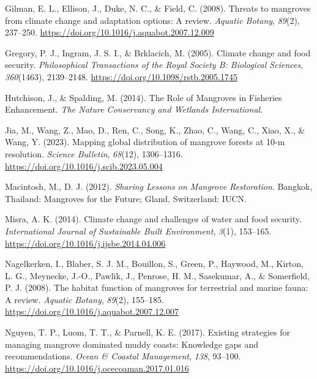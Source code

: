 \documentclass[
  12pt,
]{article}
\newlength{\cslhangindent}
\newenvironment{CSLReferences}[2] %
 {\begin{list}{}{%
  \setlength{\itemindent}{0pt}
  \setlength{\leftmargin}{0pt}
  \setlength{\parsep}{0pt}
  \ifodd #1
   \setlength{\leftmargin}{\cslhangindent}
   \setlength{\itemindent}{-1\cslhangindent}
  \fi
  \setlength{\itemsep}{#2\baselineskip}}}
 {\end{list}}
\begin{document}
\begin{CSLReferences}{1}{2}
Gilman, E. L., Ellison, J., Duke, N. C., \& Field, C. (2008). Threats to mangroves from climate change and adaptation options: {A} review. \emph{Aquatic Botany}, \emph{89}(2), 237--250. \url{https://doi.org/10.1016/j.aquabot.2007.12.009}

Gregory, P. J., Ingram, J. S. I., \& Brklacich, M. (2005). Climate change and food security. \emph{Philosophical Transactions of the Royal Society B: Biological Sciences}, \emph{360}(1463), 2139--2148. \url{https://doi.org/10.1098/rstb.2005.1745}

Hutchison, J., \& Spalding, M. (2014). The {Role} of {Mangroves} in {Fisheries Enhancement}. \emph{The Nature Conservancy and Wetlands International.}

Jia, M., Wang, Z., Mao, D., Ren, C., Song, K., Zhao, C., Wang, C., Xiao, X., \& Wang, Y. (2023). Mapping global distribution of mangrove forests at 10-m resolution. \emph{Science Bulletin}, \emph{68}(12), 1306--1316. \url{https://doi.org/10.1016/j.scib.2023.05.004}

Macintosh, M., D. J. (2012). \emph{{Sharing Lessons} on {Mangrove Restoration}}. Bangkok, Thailand: Mangroves for the Future; Gland, Switzerland: IUCN.

Misra, A. K. (2014). Climate change and challenges of water and food security. \emph{International Journal of Sustainable Built Environment}, \emph{3}(1), 153--165. \url{https://doi.org/10.1016/j.ijsbe.2014.04.006}

Nagelkerken, I., Blaber, S. J. M., Bouillon, S., Green, P., Haywood, M., Kirton, L. G., Meynecke, J.-O., Pawlik, J., Penrose, H. M., Sasekumar, A., \& Somerfield, P. J. (2008). The habitat function of mangroves for terrestrial and marine fauna: {A} review. \emph{Aquatic Botany}, \emph{89}(2), 155--185. \url{https://doi.org/10.1016/j.aquabot.2007.12.007}

Nguyen, T. P., Luom, T. T., \& Parnell, K. E. (2017). Existing strategies for managing mangrove dominated muddy coasts: {Knowledge} gaps and recommendations. \emph{Ocean \& Coastal Management}, \emph{138}, 93--100. \url{https://doi.org/10.1016/j.ocecoaman.2017.01.016}


\end{CSLReferences}
\end{document}
